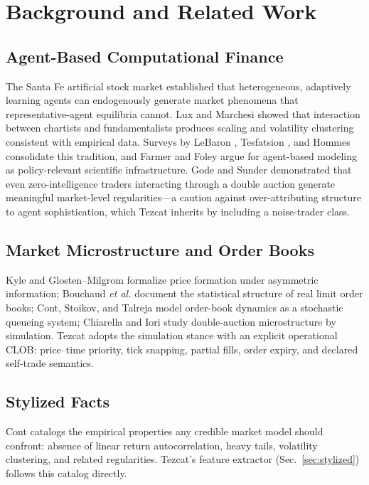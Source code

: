 \documentclass[conference]{IEEEtran}
\newcommand{\tez}{Tezcat}
\begin{document}
\section{Background and Related Work}
\label{sec:related}

\subsection{Agent-Based Computational Finance}
The Santa Fe artificial stock market \cite{arthur1997} established that
heterogeneous, adaptively learning agents can endogenously generate
market phenomena that representative-agent equilibria cannot. Lux and
Marchesi \cite{lux1999} showed that interaction between chartists and
fundamentalists produces scaling and volatility clustering consistent
with empirical data. Surveys by LeBaron \cite{lebaron2006}, Tesfatsion
\cite{tesfatsion2006}, and Hommes \cite{hommes2006} consolidate this
tradition, and Farmer and Foley \cite{farmer2009} argue for agent-based
modeling as policy-relevant scientific infrastructure. Gode and Sunder
\cite{gode1993} demonstrated that even zero-intelligence traders
interacting through a double auction generate meaningful market-level
regularities---a caution against over-attributing structure to agent
sophistication, which \tez{} inherits by including a noise-trader class.

\subsection{Market Microstructure and Order Books}
Kyle \cite{kyle1985} and Glosten--Milgrom \cite{glosten1985} formalize
price formation under asymmetric information; Bouchaud \emph{et al.}
\cite{bouchaud2002} document the statistical structure of real limit
order books; Cont, Stoikov, and Talreja \cite{cont2010} model order-book
dynamics as a stochastic queueing system; Chiarella and Iori
\cite{chiarella2002} study double-auction microstructure by simulation.
\tez{} adopts the simulation stance with an explicit operational CLOB:
price--time priority, tick snapping, partial fills, order expiry, and
declared self-trade semantics.

\subsection{Stylized Facts}
Cont \cite{cont2001} catalogs the empirical properties any credible
market model should confront: absence of linear return autocorrelation,
heavy tails, volatility clustering, and related regularities. \tez{}'s
feature extractor (Sec.~\ref{sec:stylized}) follows this catalog
directly.
\end{document}
